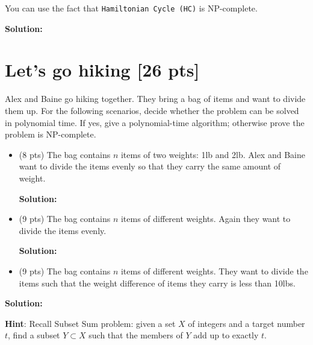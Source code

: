 \documentclass{article}
\begin{document}
You can use the fact that \texttt{Hamiltonian Cycle (HC)} is NP-complete.

\begin{tcolorbox}
{\bf Solution:}
\end{tcolorbox}

\section{Let's go hiking [26 pts]}
Alex and Baine go hiking together. They bring a bag of items and want to divide them up. For the following scenarios, decide whether the problem can be solved in polynomial time. If yes, give a polynomial-time algorithm; otherwise prove the problem is NP-complete. 
\begin{itemize}
	\item (8 pts) The bag contains $n$ items of two weights: 1lb and 2lb. Alex and Baine want to divide the items evenly so that they carry the same amount of weight. 
	
\begin{tcolorbox}
{\bf Solution:}
\end{tcolorbox}
	
	\item (9 pts) The bag contains $n$ items of different weights. Again they want to divide the items evenly. 
\begin{tcolorbox}
{\bf Solution:}
\end{tcolorbox}

	\item (9 pts) The bag contains $n$ items of different weights. They want to divide the items such that the weight difference of items they carry is less than 10lbs. 
\end{itemize}
\begin{tcolorbox}
{\bf Solution:}
\end{tcolorbox}

\textbf{Hint}: Recall Subset Sum problem: given a set $X$ of integers and a target number $t$, find a subset $Y\subset X$ such that the members of $Y$ add up to exactly $t$. 
\end{document}
